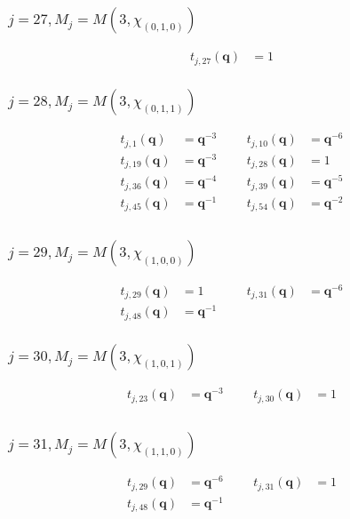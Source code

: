 \subsubsection{$j=27, M_{j}=M(3,\chi_{(0,1,0)})$}
\begin{align*}
t_{j,27}(\boldsymbol{q})&=1
\end{align*}

\subsubsection{$j=28, M_{j}=M(3,\chi_{(0,1,1)})$}
\begin{align*}
t_{j,1}(\boldsymbol{q})&=\boldsymbol{q}^{-3} &&& t_{j,10}(\boldsymbol{q})&=\boldsymbol{q}^{-6} \\
t_{j,19}(\boldsymbol{q})&=\boldsymbol{q}^{-3} &&& t_{j,28}(\boldsymbol{q})&=1 \\
t_{j,36}(\boldsymbol{q})&=\boldsymbol{q}^{-4} &&& t_{j,39}(\boldsymbol{q})&=\boldsymbol{q}^{-5} \\
t_{j,45}(\boldsymbol{q})&=\boldsymbol{q}^{-1} &&& t_{j,54}(\boldsymbol{q})&=\boldsymbol{q}^{-2} \\
\end{align*}

\subsubsection{$j=29, M_{j}=M(3,\chi_{(1,0,0)})$}
\begin{align*}
t_{j,29}(\boldsymbol{q})&=1 &&& t_{j,31}(\boldsymbol{q})&=\boldsymbol{q}^{-6} \\
t_{j,48}(\boldsymbol{q})&=\boldsymbol{q}^{-1}
\end{align*}

\subsubsection{$j=30, M_{j}=M(3,\chi_{(1,0,1)})$}
\begin{align*}
t_{j,23}(\boldsymbol{q})&=\boldsymbol{q}^{-3} &&& t_{j,30}(\boldsymbol{q})&=1 \\
\end{align*}

\subsubsection{$j=31, M_{j}=M(3,\chi_{(1,1,0)})$}
\begin{align*}
t_{j,29}(\boldsymbol{q})&=\boldsymbol{q}^{-6} &&& t_{j,31}(\boldsymbol{q})&=1 \\
t_{j,48}(\boldsymbol{q})&=\boldsymbol{q}^{-1}
\end{align*}


